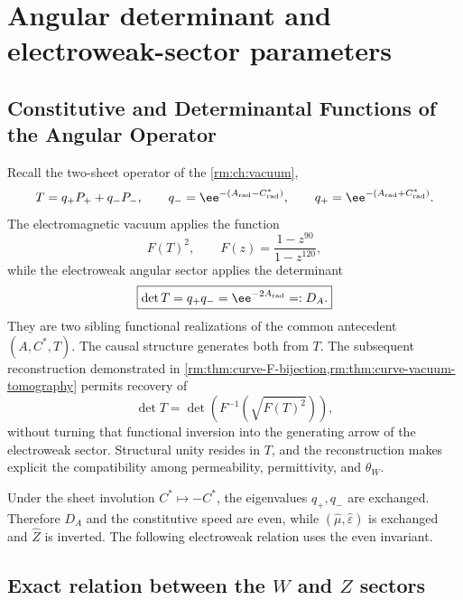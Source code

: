\section{Angular determinant and electroweak-sector parameters}
\label{rm:ch:ew}

\subsection{Constitutive and Determinantal Functions of the Angular Operator}

Recall the two-sheet operator of the \cref{rm:ch:vacuum},
\begin{equation}
\label{rm:eq:ew-angular-operator}
T=q_+P_+ +q_-P_-,
\qquad
q_-=\ee^{-(A_{\rm rad}-C^*_{\rm rad})},
\qquad
q_+=\ee^{-(A_{\rm rad}+C^*_{\rm rad})}.
\end{equation}
The electromagnetic vacuum applies the function
\begin{equation}
\label{rm:eq:ew-vacuum-reader}
F(T)^2,
\qquad
F(z)=\frac{1-z^{90}}{1-z^{120}},
\end{equation}
while the electroweak angular sector applies the determinant
\begin{equation}
\label{rm:eq:ew-determinant-reader}
\boxed{
\det T=q_+q_-=\ee^{-2A_{\rm rad}}=:D_A.}
\end{equation}
They are two sibling functional realizations of the common antecedent
\((A,C^*,T)\). The causal structure generates both from \(T\). The
subsequent reconstruction demonstrated in
\cref{rm:thm:curve-F-bijection,rm:thm:curve-vacuum-tomography} permits recovery of
\[
 \det T
 =\det\!\left(F^{-1}\!\left(\sqrt{F(T)^2}\right)\right),
\]
without turning that functional inversion into the generating arrow of the
electroweak sector. Structural unity resides in \(T\), and the reconstruction
makes explicit the compatibility among permeability, permittivity, and
\(\theta_W\).

Under the sheet involution \(C^*\mapsto-C^*\), the eigenvalues
\(q_+,q_-\) are exchanged. Therefore \(D_A\) and the constitutive speed
are even, while \((\widehat\mu,\widehat\varepsilon)\) is exchanged and
\(\widehat Z\) is inverted. The following electroweak relation uses the
even invariant.

\subsection{Exact relation between the \texorpdfstring{\(W\)}{W} and \texorpdfstring{\(Z\)}{Z} sectors}

